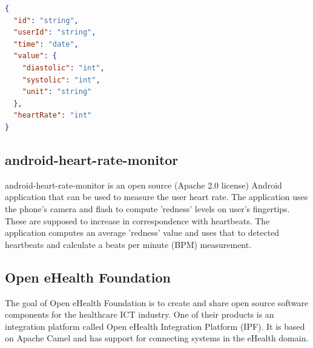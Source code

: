 

\begin{lstlisting}[language=JSON]
{
  "id": "string",
  "userId": "string",
  "time": "date",
  "value": {
    "diastolic": "int",
    "systolic": "int",
    "unit": "string"
  },
  "heartRate": "int"
}
\end{lstlisting}

\subsection{android-heart-rate-monitor}
\label{subsec:hr}

android-heart-rate-monitor is an open source (Apache 2.0 license) Android application that can be used to measure the user heart rate. 
The application uses the phone's camera and flash to compute 'redness' levels on user's fingertips. 
These are supposed to increase in correspondence with heartbeats.
The application computes an average 'redness' value and uses that to detected heartbeats and calculate a beats per minute (BPM) measurement. \cite{AndroidHeartRateMonitor}


\subsection{Open eHealth Foundation}

The goal of Open eHealth Foundation is to create and share open source software components for the healthcare ICT industry.
One of their products is an integration platform called Open eHealth Integration Platform (IPF).
It is based on Apache Camel and has support for connecting systems in the eHealth domain. \cite{OpenEHealthFoundation}


